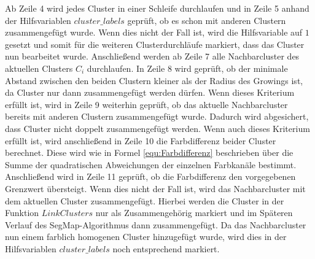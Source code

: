 Ab Zeile 4 wird jedes Cluster in einer Schleife durchlaufen und in Zeile 5 anhand der Hilfsvariablen $cluster\_labels$ geprüft, ob es schon mit anderen Clustern zusammengefügt wurde. Wenn dies nicht der Fall ist, wird die Hilfsvariable auf $1$ gesetzt und somit für die weiteren Clusterdurchläufe markiert, dass das Cluster nun bearbeitet wurde. Anschließend werden ab Zeile 7 alle Nachbarcluster des aktuellen Clusters $C_i$ durchlaufen. In Zeile 8 wird geprüft, ob der minimale Abstand zwischen den beiden Clustern kleiner als der Radius des Growings ist, da Cluster nur dann zusammengefügt werden dürfen. Wenn dieses Kriterium erfüllt ist, wird in Zeile 9 weiterhin geprüft, ob das aktuelle Nachbarcluster bereits mit anderen Clustern zusammengefügt wurde. Dadurch wird abgesichert, dass Cluster nicht doppelt zusammengefügt werden. Wenn auch dieses Kriterium erfüllt ist, wird anschließend in Zeile 10 die Farbdifferenz beider Cluster berechnet. Diese wird wie in Formel \ref{equ:Farbdifferenz} beschrieben über die Summe der qua\-dra\-tisch\-en Abweichungen der einzelnen Farbkanäle bestimmt. Anschließend wird in Zeile 11 geprüft, ob die Farbdifferenz den vorgegebenen Grenzwert übersteigt. Wenn dies nicht der Fall ist, wird das Nachbarcluster mit dem aktuellen Cluster  zusammengefügt. Hierbei werden die Cluster in der Funktion $LinkClusters$ nur als Zusammengehörig markiert und im Späteren Verlauf des SegMap-Algorithmus dann zusammengefügt. Da das Nachbarcluster nun einem farblich homogenen Cluster hinzugefügt wurde, wird dies in der Hilfsvariablen $cluster\_labels$ noch entsprechend markiert.  

%
%
%
%
%


